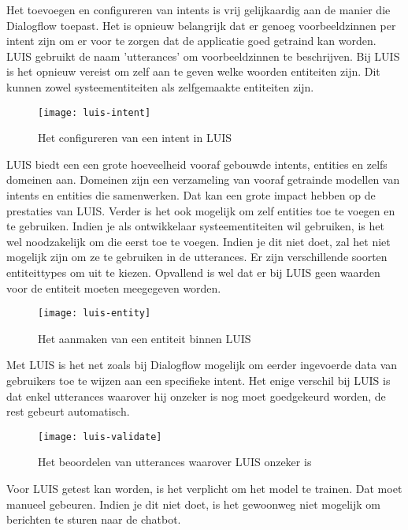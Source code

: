 Het toevoegen en configureren van intents is vrij gelijkaardig aan de manier die Dialogflow toepast. Het is opnieuw belangrijk dat er genoeg voorbeeldzinnen per intent zijn om er voor te zorgen dat de applicatie goed getraind kan worden. LUIS gebruikt de naam 'utterances' om voorbeeldzinnen te beschrijven. Bij LUIS is het opnieuw vereist om zelf aan te geven welke woorden entiteiten zijn. Dit kunnen zowel systeementiteiten als zelfgemaakte entiteiten zijn.

\begin{figure}[H]
    \label{fig:luis-intent}
    \centering
    \texttt{[image: luis-intent]}
    \caption{Het configureren van een intent in LUIS}
\end{figure}

LUIS biedt een een grote hoeveelheid vooraf gebouwde intents, entities en zelfs domeinen aan. Domeinen zijn een verzameling van vooraf getrainde modellen van intents en entities die samenwerken. Dat kan een grote impact hebben op de prestaties van LUIS. Verder is het ook mogelijk om zelf entities toe te voegen en te gebruiken. Indien je als ontwikkelaar systeementiteiten wil gebruiken, is het wel noodzakelijk om die eerst toe te voegen. Indien je dit niet doet, zal het niet mogelijk zijn om ze te gebruiken in de utterances. Er zijn verschillende soorten entiteittypes om uit te kiezen. Opvallend is wel dat er bij LUIS geen waarden voor de entiteit moeten meegegeven worden.

\begin{figure}[H]
    \label{fig:luis-entity}
    \centering
    \texttt{[image: luis-entity]}
    \caption{Het aanmaken van een entiteit binnen LUIS}
\end{figure}

Met LUIS is het net zoals bij Dialogflow mogelijk om eerder ingevoerde data van gebruikers toe te wijzen aan een specifieke intent. Het enige verschil bij LUIS is dat enkel utterances waarover hij onzeker is nog moet goedgekeurd worden, de rest gebeurt automatisch.

\begin{figure}[H]
    \label{fig:luis-validate}
    \centering
    \texttt{[image: luis-validate]}
    \caption{Het beoordelen van utterances waarover LUIS onzeker is}
\end{figure}

Voor LUIS getest kan worden, is het verplicht om het model te trainen. Dat moet manueel gebeuren. Indien je dit niet doet, is het gewoonweg niet mogelijk om berichten te sturen naar de chatbot.

